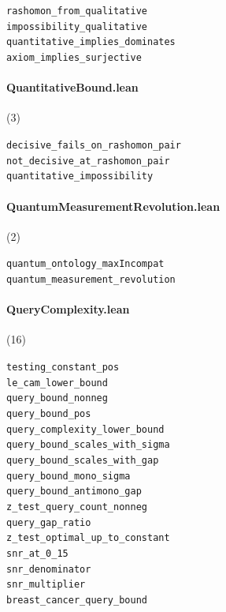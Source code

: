 {\footnotesize
\texttt{rashomon\_from\_qualitative}\\
\texttt{impossibility\_qualitative}\\
\texttt{quantitative\_implies\_dominates}\\
\texttt{axiom\_implies\_surjective}\\
}

\paragraph{QuantitativeBound.lean} (3)

{\footnotesize
\texttt{decisive\_fails\_on\_rashomon\_pair}\\
\texttt{not\_decisive\_at\_rashomon\_pair}\\
\texttt{quantitative\_impossibility}\\
}

\paragraph{QuantumMeasurementRevolution.lean} (2)

{\footnotesize
\texttt{quantum\_ontology\_maxIncompat}\\
\texttt{quantum\_measurement\_revolution}\\
}

\paragraph{QueryComplexity.lean} (16)

{\footnotesize
\texttt{testing\_constant\_pos}\\
\texttt{le\_cam\_lower\_bound}\\
\texttt{query\_bound\_nonneg}\\
\texttt{query\_bound\_pos}\\
\texttt{query\_complexity\_lower\_bound}\\
\texttt{query\_bound\_scales\_with\_sigma}\\
\texttt{query\_bound\_scales\_with\_gap}\\
\texttt{query\_bound\_mono\_sigma}\\
\texttt{query\_bound\_antimono\_gap}\\
\texttt{z\_test\_query\_count\_nonneg}\\
\texttt{query\_gap\_ratio}\\
\texttt{z\_test\_optimal\_up\_to\_constant}\\
\texttt{snr\_at\_0\_15}\\
\texttt{snr\_denominator}\\
\texttt{snr\_multiplier}\\
\texttt{breast\_cancer\_query\_bound}\\
}

